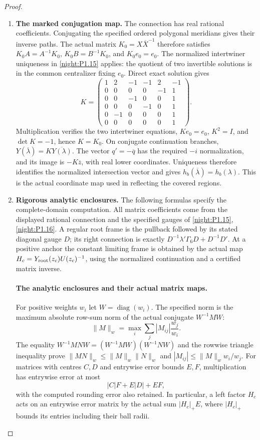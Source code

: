 \begin{proof}
\begin{enumerate}[label=\arabic*.]
\item \textbf{The marked conjugation map.}
The connection has real rational coefficients. Conjugating the
specified ordered polygonal meridians gives their inverse paths.
The actual matrix $K_0=X\overline X^{-1}$ therefore satisfies
$K_0A=A^{-1}K_0$, $K_0B=B^{-1}K_0$, and $K_0e_0=e_0$.
The normalized intertwiner uniqueness in \cref{night:P1.15}
applies: the quotient of two invertible solutions is in the
common centralizer fixing $e_0$. Direct exact solution gives
\[
 K=\begin{pmatrix}
 1&2&-1&-1&2&-1\\
 0&0&0&0&-1&1\\
 0&0&-1&0&0&1\\
 0&0&0&-1&0&1\\
 0&-1&0&0&0&1\\
 0&0&0&0&0&1
 \end{pmatrix}.
\]
Multiplication verifies the two intertwiner equations,
$Ke_0=e_0$, $K^2=I$, and $\det K=-1$, hence $K=K_0$.
On conjugate continuation branches,
$Y(\overline\lambda)=K\overline{Y(\lambda)}$.
The vector $q'=-\overline q$ has the required $-i$ normalization,
and its image is $-K\overline z$, with real lower coordinates.
Uniqueness therefore identifies the normalized intersection
vector and gives
$h_b(\overline\lambda)=h_b(\lambda)$.
This is the actual coordinate map used in reflecting the covered
regions.

\item \textbf{Rigorous analytic enclosures.}
The following formulas specify the complete-domain computation.
All matrix coefficients come from the displayed rational
connection and the specified gauges of
\cref{night:P1.15}, \cref{night:P1.16}. A regular root frame is the
pullback followed by its stated diagonal gauge $D$; its right
connection is exactly
$D^{-1}\lambda'\Gamma_6D+D^{-1}D'$.
At a positive anchor the constant limiting frame is obtained by
the actual map $H_c=Y_{\rm root}(z_c)U(z_c)^{-1}$, using the
normalized continuation and a certified matrix inverse.

\paragraph{The analytic enclosures and their actual matrix maps.}
For positive weights $w_i$ let $W=\operatorname{diag}(w_i)$. The
specified norm is the maximum absolute row-sum norm of the actual
conjugate $W^{-1}MW$:
\[
 \|M\|_w=\max_i\sum_j|M_{ij}|\frac{w_j}{w_i}.
\]
The equality $W^{-1}MNW=(W^{-1}MW)(W^{-1}NW)$ and the rowwise
triangle inequality prove
$\|MN\|_w\le\|M\|_w\|N\|_w$ and
$|M_{ij}|\le\|M\|_w w_i/w_j$. For matrices with centres $C,D$
and entrywise error bounds $E,F$, multiplication has entrywise
error at most
\[
 |C|F+E|D|+EF,
\]
with the computed rounding error also retained. In particular, a
left factor $H_c$ acts on an entrywise error matrix by the actual
sum $|H_c|_+E$, where $|H_c|_+$ bounds its entries including their
ball radii.


\end{enumerate}
\end{proof}
